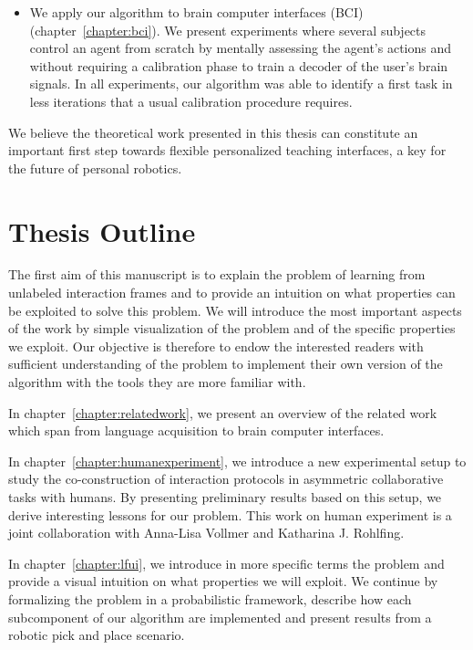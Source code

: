 \begin{itemize}
\item We apply our algorithm to brain computer interfaces (BCI) \cite{grizou2013zero,grizou2014calibration} (chapter~\ref{chapter:bci}). We present experiments where several subjects control an agent from scratch by mentally assessing the agent's actions and without requiring a calibration phase to train a decoder of the user's brain signals. In all experiments, our algorithm was able to identify a first task in less iterations that a usual calibration procedure requires.

\end{itemize}

\paragrah{} We believe the theoretical work presented in this thesis can constitute an important first step towards flexible personalized teaching interfaces, a key for the future of personal robotics.

\section{Thesis Outline}

The first aim of this manuscript is to explain the problem of learning from unlabeled interaction frames and to provide an intuition on what properties can be exploited to solve this problem. We will introduce the most important aspects of the work by simple visualization of the problem and of the specific properties we exploit. Our objective is therefore to endow the interested readers with sufficient understanding of the problem to implement their own version of the algorithm with the tools they are more familiar with.

In chapter~\ref{chapter:relatedwork}, we present an overview of the related work which span from language acquisition to brain computer interfaces.

In chapter~\ref{chapter:humanexperiment}, we introduce a new experimental setup to study the co-construction of interaction protocols in asymmetric collaborative tasks with humans. By presenting preliminary results based on this setup, we derive interesting lessons for our problem. This work on human experiment is a joint collaboration with Anna-Lisa Vollmer and Katharina J. Rohlfing.

In chapter~\ref{chapter:lfui}, we introduce in more specific terms the problem and provide a visual intuition on what properties we will exploit. We continue by formalizing the problem in a probabilistic framework, describe how each subcomponent of our algorithm are implemented and present results from a robotic pick and place scenario.

